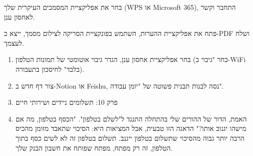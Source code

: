 בחר את אפליקציית המסמכים העיקרית שלך (WPS או Microsoft 365), התחבר וקשר לאחסון ענן.

\begin{tcbpractice}{פתח את אפליקציית ההערות, השתמש בפונקציית הסריקה לצילום מסמך, ייצא כ-PDF ושלח לעצמך.}
\begin{enumerate}
  \item בחר אפליקציית אחסון ענן, הגדר גיבוי אוטומטי של תמונות הטלפון (בחר "גיבוי ב-WiFi בלבד" לחיסכון בתעבורה).
  \item צור דף חדש ב-Notion או Feishu, נסה לבנות תבנית פשוטה של "יומן עבודה".
  \item פרק 10: תשלומים ניידים ושירותי חיים
  \item האמת, הדור של ההורים שלי בהתחלה התנגד ל"לשלם בטלפון". "הכסף בטלפון, מה אם מישהו יגנוב אותו?" הדאגה הזו טבעית, אבל המציאות היא: הסיכוי שתאבד מזומן מהכיס הרבה יותר גבוה מהסיכוי שתשלום בטלפון ייגנב. תשלום בטלפון זה לא לשים כסף בתוך הטלפון, זה רק מפתח, מפתח שפותח את חשבון הבנק שלך.
\end{enumerate}

\end{tcbpractice}
